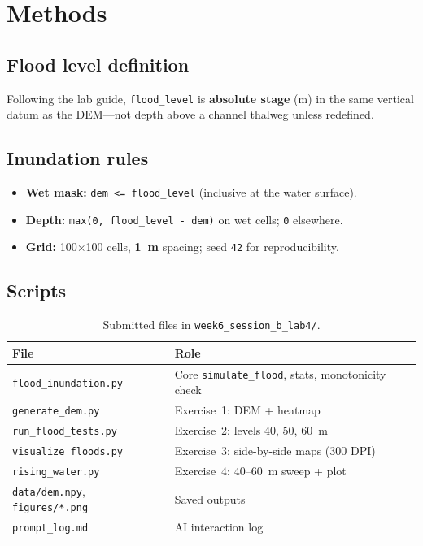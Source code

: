 \documentclass[11pt,a4paper]{article}
\begin{document}
\section{Methods}

\subsection{Flood level definition}
Following the lab guide, \texttt{flood\_level} is \textbf{absolute stage} (m) in the same vertical datum as the DEM---not depth above a channel thalweg unless redefined.

\subsection{Inundation rules}
\begin{itemize}[noitemsep]
  \item \textbf{Wet mask:} \texttt{dem <= flood\_level} (inclusive at the water surface).
  \item \textbf{Depth:} \texttt{max(0, flood\_level - dem)} on wet cells; \texttt{0} elsewhere.
  \item \textbf{Grid:} 100$\times$100 cells, \textbf{1~m} spacing; seed \texttt{42} for reproducibility.
\end{itemize}

\subsection{Scripts}
\begin{table}[htbp]
  \centering
  \caption{Submitted files in \texttt{week6\_session\_b\_lab4/}.}
  \label{tab:files}
  \small
  \begin{tabular}{@{}ll@{}}
    \toprule
    File & Role \\
    \midrule
    \texttt{flood\_inundation.py} & Core \texttt{simulate\_flood}, stats, monotonicity check \\
    \texttt{generate\_dem.py} & Exercise~1: DEM + heatmap \\
    \texttt{run\_flood\_tests.py} & Exercise~2: levels 40, 50, 60~m \\
    \texttt{visualize\_floods.py} & Exercise~3: side-by-side maps (300 DPI) \\
    \texttt{rising\_water.py} & Exercise~4: 40--60~m sweep + plot \\
    \texttt{data/dem.npy}, \texttt{figures/*.png} & Saved outputs \\
    \texttt{prompt\_log.md} & AI interaction log \\
    \bottomrule
  \end{tabular}
\end{table}
\end{document}
